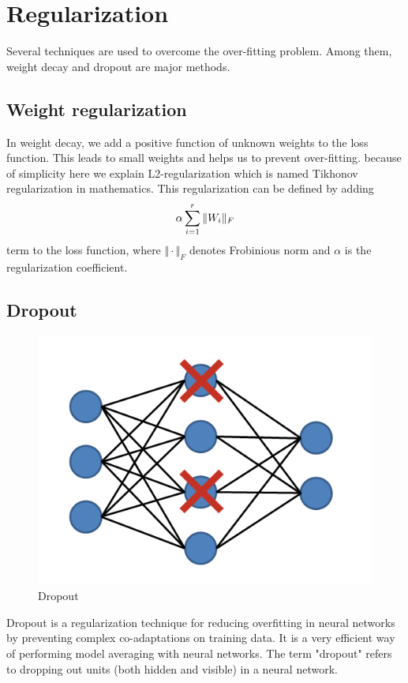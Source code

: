 \documentclass[10pt]{SelfArx} %
\begin{document}
	\section{Regularization}
		Several techniques are used to overcome the over-fitting problem. Among them, weight decay and dropout are major methods. 
	\subsection{Weight regularization}
In weight decay, we add a positive function of unknown weights to the loss function. This leads to small weights and helps us to prevent over-fitting. because of simplicity here we explain L2-regularization which is named Tikhonov regularization in mathematics.
	This regularization can be defined by adding 
	\begin{equation}
	\centering
	\alpha \sum_{i=1}^r \Vert W_i \Vert_F
	\end{equation}
	term to the loss function, where $\Vert \cdot \Vert_F$ denotes Frobinious norm and $\alpha$ is the regularization coefficient.
	\subsection{Dropout}
		\begin{figure}\centering 
		\includegraphics[width=\linewidth]{img/dropout}
		\caption{Dropout}
	\end{figure}
	Dropout is a regularization technique for reducing overfitting in neural networks by preventing complex co-adaptations on training data. It is a very efficient way of performing model averaging with neural networks. The term "dropout" refers to dropping out units (both hidden and visible) in a neural network.
\end{document}
